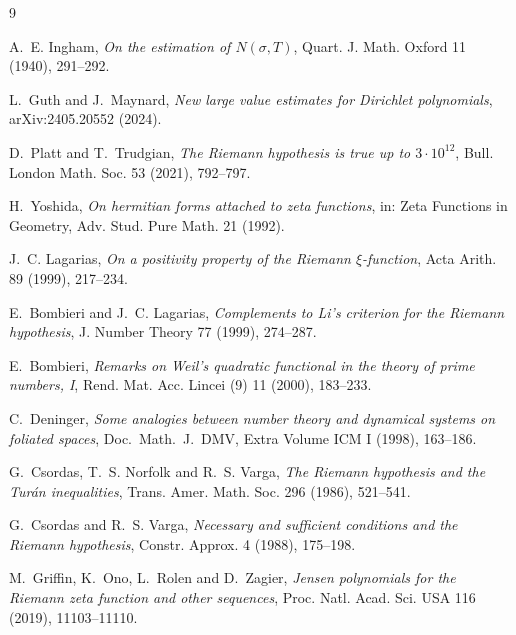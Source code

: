 \documentclass[11pt]{article}
\theoremstyle{plain}
\theoremstyle{definition}
\theoremstyle{remark}
\begin{document}
\begin{thebibliography}{9}

 A.~E. Ingham, \emph{On the estimation of $N(\sigma,T)$},
Quart. J. Math. Oxford 11 (1940), 291--292.

 L.~Guth and J.~Maynard, \emph{New large value estimates
for Dirichlet polynomials}, arXiv:2405.20552 (2024).

 D.~Platt and T.~Trudgian, \emph{The Riemann hypothesis
is true up to $3\cdot10^{12}$}, Bull. London Math. Soc. 53 (2021), 792--797.

 H.~Yoshida, \emph{On hermitian forms attached to zeta
functions}, in: Zeta Functions in Geometry, Adv. Stud. Pure Math. 21 (1992).

 J.~C. Lagarias, \emph{On a positivity property of the
Riemann $\xi$-function}, Acta Arith. 89 (1999), 217--234.

 E.~Bombieri and J.~C. Lagarias, \emph{Complements
to Li's criterion for the Riemann hypothesis}, J. Number Theory 77 (1999),
274--287.

 E.~Bombieri, \emph{Remarks on Weil's quadratic functional
in the theory of prime numbers, I}, Rend. Mat. Acc. Lincei (9) 11 (2000),
183--233.

 C.~Deninger, \emph{Some analogies between number theory
and dynamical systems on foliated spaces}, Doc.\ Math.\ J.\ DMV, Extra Volume
ICM I (1998), 163--186.

 G.~Csordas, T.~S. Norfolk and R.~S. Varga,
\emph{The Riemann hypothesis and the Tur\'an inequalities}, Trans. Amer. Math.
Soc. 296 (1986), 521--541.

 G.~Csordas and R.~S. Varga, \emph{Necessary and
sufficient conditions and the Riemann hypothesis}, Constr. Approx. 4 (1988),
175--198.

 M.~Griffin, K.~Ono, L.~Rolen and D.~Zagier,
\emph{Jensen polynomials for the Riemann zeta function and other sequences},
Proc. Natl. Acad. Sci. USA 116 (2019), 11103--11110.

\end{thebibliography}
\end{document}
